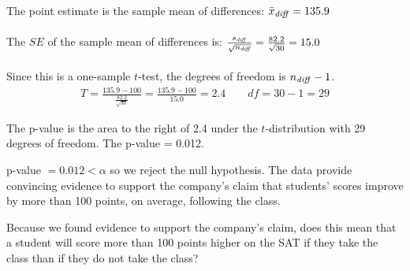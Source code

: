 \begin{examplewrap}
\begin{nexample}
\begin{description}
The point estimate is the sample mean of differences:  $\bar{x}_{\text{\emph{diff}}}  = 135.9$ 
\\
\\
The $SE$ of the sample mean of differences is:  $\frac{s_{\text{\emph{diff}}} }{\sqrt{n_{\text{\emph{diff}}} }} = \frac{82.2}{\sqrt{30}} = 15.0$
\\
\\
Since this is a one-sample $t$-test, the degrees of freedom is $n_{\text{\emph{diff}}}-1$.
\begin{align*}
T = \frac{135.9-100}{\frac{82.2}{\sqrt{30}}} = \frac{135.9-100}{15.0}=2.4 \qquad df=30-1=29
\end{align*}

The p-value is the area to the right of 2.4 under the $t$-distribution with 29 degrees of freedom.  The p-value = 0.012.

\item[\inferencestep{Conclude}]  p-value $=0.012<\alpha$ so we reject the null hypothesis. The data provide convincing evidence to support the company's claim that students' scores improve by more than 100 points, on average, following the class.


\end{description}
\end{nexample}
\end{examplewrap}


\begin{exercisewrap}
\begin{nexercise}
Because we found evidence to support the company's claim, does this mean that a student will score more than 100 points higher on the SAT if they take the class than if they do not take the class?\footnotemark{}
\end{nexercise}
\end{exercisewrap}


\D{\newpage}

